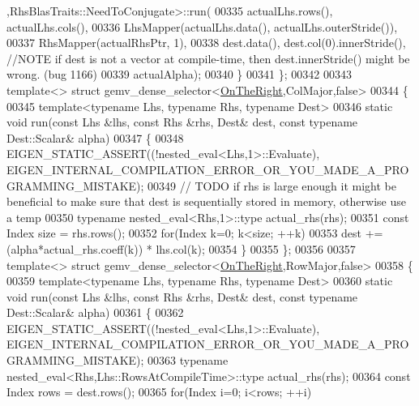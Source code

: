 \begin{DoxyCode}
      ,RhsBlasTraits::NeedToConjugate>::run(
00335         actualLhs.rows(), actualLhs.cols(),
00336         LhsMapper(actualLhs.data(), actualLhs.outerStride()),
00337         RhsMapper(actualRhsPtr, 1),
00338         dest.data(), dest.col(0).innerStride(), \textcolor{comment}{//NOTE  if dest is not a vector at compile-time, then
       dest.innerStride() might be wrong. (bug 1166)}
00339         actualAlpha);
00340   \}
00341 \};
00342 
00343 \textcolor{keyword}{template}<> \textcolor{keyword}{struct }gemv\_dense\_selector<\hyperlink{group__enums_ggac22de43beeac7a78b384f99bed5cee0ba99dc75d8e00b6c3a5bdc31940f47492b}{OnTheRight},ColMajor,false>
00344 \{
00345   \textcolor{keyword}{template}<\textcolor{keyword}{typename} Lhs, \textcolor{keyword}{typename} Rhs, \textcolor{keyword}{typename} Dest>
00346   \textcolor{keyword}{static} \textcolor{keywordtype}{void} run(\textcolor{keyword}{const} Lhs &lhs, \textcolor{keyword}{const} Rhs &rhs, Dest& dest, \textcolor{keyword}{const} \textcolor{keyword}{typename} Dest::Scalar& alpha)
00347   \{
00348     EIGEN\_STATIC\_ASSERT((!nested\_eval<Lhs,1>::Evaluate),
      EIGEN\_INTERNAL\_COMPILATION\_ERROR\_OR\_YOU\_MADE\_A\_PROGRAMMING\_MISTAKE);
00349     \textcolor{comment}{// TODO if rhs is large enough it might be beneficial to make sure that dest is sequentially stored in
       memory, otherwise use a temp}
00350     \textcolor{keyword}{typename} nested\_eval<Rhs,1>::type actual\_rhs(rhs);
00351     \textcolor{keyword}{const} Index size = rhs.rows();
00352     \textcolor{keywordflow}{for}(Index k=0; k<size; ++k)
00353       dest += (alpha*actual\_rhs.coeff(k)) * lhs.col(k);
00354   \}
00355 \};
00356 
00357 \textcolor{keyword}{template}<> \textcolor{keyword}{struct }gemv\_dense\_selector<\hyperlink{group__enums_ggac22de43beeac7a78b384f99bed5cee0ba99dc75d8e00b6c3a5bdc31940f47492b}{OnTheRight},RowMajor,false>
00358 \{
00359   \textcolor{keyword}{template}<\textcolor{keyword}{typename} Lhs, \textcolor{keyword}{typename} Rhs, \textcolor{keyword}{typename} Dest>
00360   \textcolor{keyword}{static} \textcolor{keywordtype}{void} run(\textcolor{keyword}{const} Lhs &lhs, \textcolor{keyword}{const} Rhs &rhs, Dest& dest, \textcolor{keyword}{const} \textcolor{keyword}{typename} Dest::Scalar& alpha)
00361   \{
00362     EIGEN\_STATIC\_ASSERT((!nested\_eval<Lhs,1>::Evaluate),
      EIGEN\_INTERNAL\_COMPILATION\_ERROR\_OR\_YOU\_MADE\_A\_PROGRAMMING\_MISTAKE);
00363     \textcolor{keyword}{typename} nested\_eval<Rhs,Lhs::RowsAtCompileTime>::type actual\_rhs(rhs);
00364     \textcolor{keyword}{const} Index rows = dest.rows();
00365     \textcolor{keywordflow}{for}(Index i=0; i<rows; ++i)

\end{DoxyCode}

